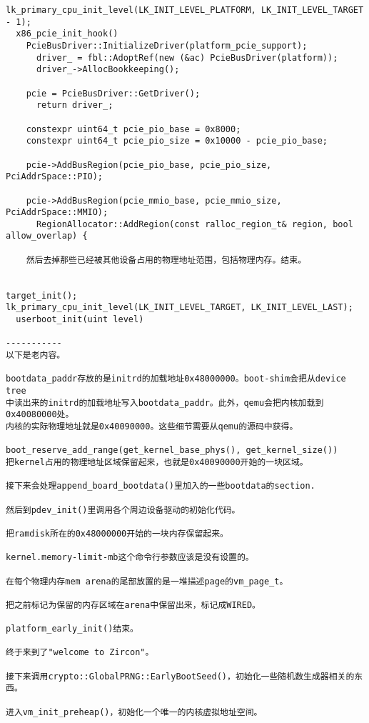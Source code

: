 \begin{verbatim}
lk_primary_cpu_init_level(LK_INIT_LEVEL_PLATFORM, LK_INIT_LEVEL_TARGET - 1);
  x86_pcie_init_hook()
    PcieBusDriver::InitializeDriver(platform_pcie_support);
      driver_ = fbl::AdoptRef(new (&ac) PcieBusDriver(platform));
      driver_->AllocBookkeeping();

    pcie = PcieBusDriver::GetDriver();
      return driver_;

    constexpr uint64_t pcie_pio_base = 0x8000;
    constexpr uint64_t pcie_pio_size = 0x10000 - pcie_pio_base;
  
    pcie->AddBusRegion(pcie_pio_base, pcie_pio_size, PciAddrSpace::PIO);

    pcie->AddBusRegion(pcie_mmio_base, pcie_mmio_size, PciAddrSpace::MMIO);
      RegionAllocator::AddRegion(const ralloc_region_t& region, bool allow_overlap) {

    然后去掉那些已经被其他设备占用的物理地址范围，包括物理内存。结束。


target_init();
lk_primary_cpu_init_level(LK_INIT_LEVEL_TARGET, LK_INIT_LEVEL_LAST);
  userboot_init(uint level)

-----------
以下是老内容。

bootdata_paddr存放的是initrd的加载地址0x48000000。boot-shim会把从device tree
中读出来的initrd的加载地址写入bootdata_paddr。此外，qemu会把内核加载到0x40080000处。
内核的实际物理地址就是0x40090000。这些细节需要从qemu的源码中获得。

boot_reserve_add_range(get_kernel_base_phys(), get_kernel_size())
把kernel占用的物理地址区域保留起来，也就是0x40090000开始的一块区域。

接下来会处理append_board_bootdata()里加入的一些bootdata的section.

然后到pdev_init()里调用各个周边设备驱动的初始化代码。

把ramdisk所在的0x48000000开始的一块内存保留起来。

kernel.memory-limit-mb这个命令行参数应该是没有设置的。

在每个物理内存mem arena的尾部放置的是一堆描述page的vm_page_t。

把之前标记为保留的内存区域在arena中保留出来，标记成WIRED。

platform_early_init()结束。

终于来到了"welcome to Zircon"。

接下来调用crypto::GlobalPRNG::EarlyBootSeed()，初始化一些随机数生成器相关的东西。

进入vm_init_preheap()，初始化一个唯一的内核虚拟地址空间。


\end{verbatim}
